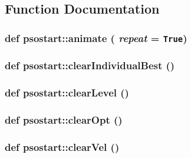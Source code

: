 \subsection{Function Documentation}
\hypertarget{namespacepsostart_952ed2c117d6b30cdc76dcbeec8e2648}{
\subsubsection{\setlength{\rightskip}{0pt plus 5cm}def psostart::animate ( {\em repeat} = {\tt True})}}
\label{namespacepsostart_952ed2c117d6b30cdc76dcbeec8e2648}


\hypertarget{namespacepsostart_da7f48a1a5af9be960f84bcf824048e7}{
\subsubsection{\setlength{\rightskip}{0pt plus 5cm}def psostart::clearIndividualBest ()}}
\label{namespacepsostart_da7f48a1a5af9be960f84bcf824048e7}


\hypertarget{namespacepsostart_3c2fc695e3997b0bff7cddfb8c832834}{
\subsubsection{\setlength{\rightskip}{0pt plus 5cm}def psostart::clearLevel ()}}
\label{namespacepsostart_3c2fc695e3997b0bff7cddfb8c832834}


\hypertarget{namespacepsostart_b16f0613573a26782623601f5311b1cd}{
\subsubsection{\setlength{\rightskip}{0pt plus 5cm}def psostart::clearOpt ()}}
\label{namespacepsostart_b16f0613573a26782623601f5311b1cd}


\hypertarget{namespacepsostart_50d9c4abda05d089b5a7ae925c7a2ba3}{
\subsubsection{\setlength{\rightskip}{0pt plus 5cm}def psostart::clearVel ()}}
\label{namespacepsostart_50d9c4abda05d089b5a7ae925c7a2ba3}


